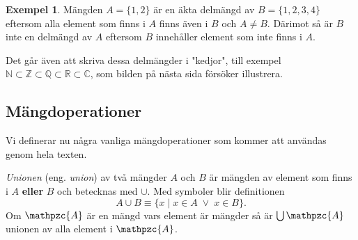 \documentclass{article}
\theoremstyle{definition}
\newtheorem{exmp}[thm]{Exempel}
\begin{document}
\begin{exmp}
Mängden $A = \{1, 2\}$ är en 
äkta delmängd av $B = \{1, 2, 3, 4\}$ eftersom alla element som finns i $A$ finns även i $B$ och 
$A \neq B$. Därimot så
är $B$ inte en delmängd av $A$ eftersom $B$ innehåller element som inte finns i $A$.
\end{exmp}
 
Det går 
även att skriva dessa delmängder i "kedjor", till exempel 
$\mathbb{N} \subset \mathbb{Z} \subset \mathbb{Q} \subset \mathbb{R} \subset \mathbb{C}$, som
bilden på nästa sida försöker illustrera. 



\begin{center}
\end{center}

\subsection{Mängdoperationer}
Vi definerar nu några vanliga mängdoperationer som kommer att användas genom hela texten. 

\begin{mydef}{}{}
  \textit{Unionen} (eng. \textit{union}) av två mängder $A$ och $B$ är mängden av element som finns i 
  $A$ \textbf{eller} $B$ och betecknas med $\cup$. Med symboler blir definitionen
  \[A \cup B \equiv \{x \; | \; x \in A \; \lor \; x \in B  \}.\]
  Om $\mathpzc{A}$ är en mängd vars element är mängder så är $\bigcup \mathpzc{A}$ unionen
  av alla element i $\mathpzc{A}$. 
\end{mydef}
\end{document}
